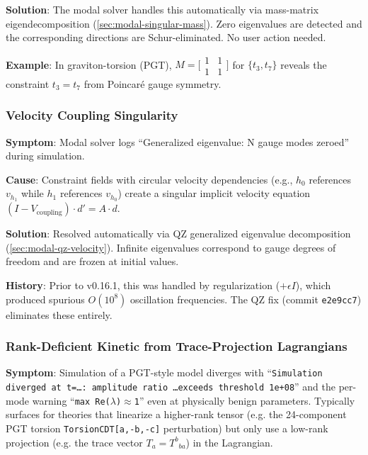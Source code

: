 \textbf{Solution}: The modal solver handles this automatically via mass-matrix eigendecomposition (\cref{sec:modal-singular-mass}). Zero eigenvalues are detected and the corresponding directions are Schur-eliminated. No user action needed.

\textbf{Example}: In graviton-torsion (PGT), $M = \bigl[\begin{smallmatrix} 1 & 1 \\ 1 & 1 \end{smallmatrix}\bigr]$ for $\{t_3, t_7\}$ reveals the constraint $t_3 = t_7$ from Poincar\'e gauge symmetry.

\subsubsection{Velocity Coupling Singularity}
\label{sec:troubleshoot-velocity-coupling}

\textbf{Symptom}: Modal solver logs ``Generalized eigenvalue: N gauge modes zeroed'' during simulation.

\textbf{Cause}: Constraint fields with circular velocity dependencies (e.g., $h_0$ references $v_{h_1}$ while $h_1$ references $v_{h_0}$) create a singular implicit velocity equation $(I - V_\text{coupling}) \cdot d' = A \cdot d$.

\textbf{Solution}: Resolved automatically via QZ generalized eigenvalue decomposition (\cref{sec:modal-qz-velocity}). Infinite eigenvalues correspond to gauge degrees of freedom and are frozen at initial values.

\textbf{History}: Prior to v0.16.1, this was handled by regularization ($+\epsilon I$), which produced spurious $O(10^8)$ oscillation frequencies. The QZ fix (commit \texttt{e2e9cc7}) eliminates these entirely.

\subsubsection{Rank-Deficient Kinetic from Trace-Projection Lagrangians}
\label{sec:troubleshooting-rank-deficient-kinetic}

\textbf{Symptom}: Simulation of a PGT-style model diverges with ``\texttt{Simulation diverged at t=\ldots: amplitude ratio \ldots exceeds threshold 1e+08}'' and the per-mode warning ``\texttt{max Re($\lambda$)$\approx$1}'' even at physically benign parameters. Typically surfaces for theories that linearize a higher-rank tensor (e.g. the 24-component PGT torsion \texttt{TorsionCDT[a,-b,-c]} perturbation) but only use a low-rank projection (e.g. the trace vector $T_a = T^b{}_{ba}$) in the Lagrangian.

